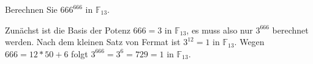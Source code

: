 Berechnen Sie $666^{666}$ in $\mathbb{F}_{13}$.

\begin{loesung}
Zunächst ist die Basis der Potenz $666=3$ in $\mathbb{F}_{13}$, es
muss also nur $3^{666}$ berechnet werden.
Nach dem kleinen Satz von Fermat ist $3^{12}=1$ in $\mathbb{F}_{13}$.
Wegen $666 = 12*50+6$ folgt
$ 3^{666} = 3^6=729=1$ in $\mathbb{F}_{13}$.
\end{loesung}
